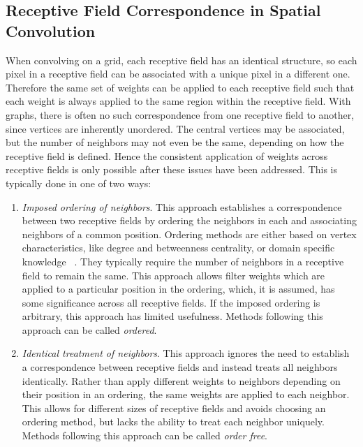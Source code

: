\subsection{Receptive Field Correspondence in Spatial Convolution}


When convolving on a grid, each receptive field has an identical structure, so each pixel in a receptive field can be associated with a unique pixel in a different one.
Therefore the same set of weights can be applied to each receptive field such that each weight is always applied to the same region within the receptive field.
With graphs, there is often no such correspondence from one receptive field to another, since vertices are inherently unordered.
The central vertices may be associated, but the number of neighbors may not even be the same, depending on how the receptive field is defined. 
Hence the consistent application of weights across receptive fields is only possible after these issues have been addressed.
This is typically done in one of two ways:

\begin{enumerate}
	\item \textit{Imposed ordering of neighbors}. This approach establishes a correspondence between two receptive fields by ordering the neighbors in each and associating neighbors of a common position. 
	Ordering methods are either based on vertex characteristics, like degree and betweenness centrality, or domain specific knowledge ~\cite{niepert2016, duvenaud2015}.
	They typically require the number of neighbors in a receptive field to remain the same.
	This approach allows filter weights which are applied to a particular position in the ordering, which, it is assumed, has some significance across all receptive fields.
	If the imposed ordering is arbitrary, this approach has limited usefulness.
	Methods following this approach can be called \emph{ordered}.
	
	\item \textit{Identical treatment of neighbors}. This approach ignores the need to establish a correspondence between receptive fields and instead treats all neighbors identically.
	Rather than apply different weights to neighbors depending on their position in an ordering, the same weights are applied to each neighbor.
	This allows for different sizes of receptive fields and avoids choosing an ordering method, but lacks the ability to treat each neighbor uniquely.
	Methods following this approach can be called \emph{order free}.
\end{enumerate}

